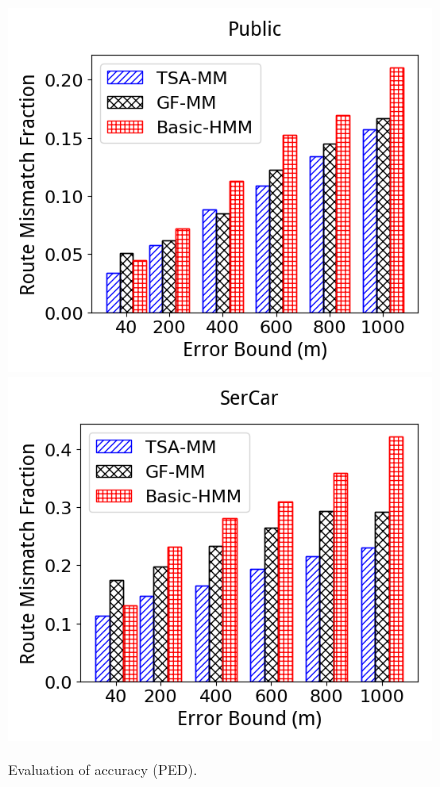 \begin{figure}[tb!]
	\centering
  \includegraphics[scale=0.3]{Figures/Exp-epsilon-rmf-SIPED-Public.png}
  \includegraphics[scale=0.3]{Figures/Exp-epsilon-rmf-SIPED-SerCar.png}
  \vspace{-2ex}
  \caption{\small Evaluation of accuracy (PED).} \label{fig:rmf-epsilon-acc-ped}
  \vspace{-3ex}
\end{figure}

